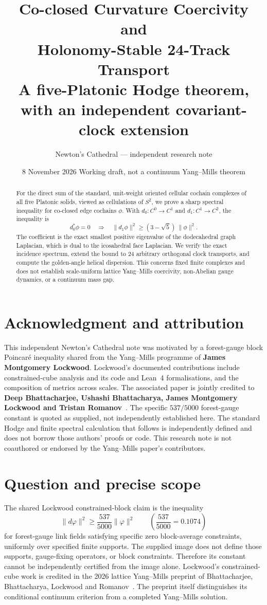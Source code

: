 \documentclass[11pt,a4paper]{article}
\title{\vspace{-1.1cm}\textbf{Co-closed Curvature Coercivity and\\Holonomy-Stable 24-Track Transport}\\[5pt]\large A five-Platonic Hodge theorem, with an independent covariant-clock extension}
\author{Newton's Cathedral --- independent research note}
\date{8 November 2026 \;\textbullet\; Working draft, not a continuum Yang--Mills theorem}
\begin{document}
\maketitle
\vspace{-7mm}
\begin{abstract}
For the direct sum of the standard, unit-weight oriented cellular cochain complexes of all five Platonic solids, viewed as cellulations of $S^2$, we prove a sharp spectral inequality for co-closed edge cochains $\phi$. With $d_0:C^0\to C^1$ and $d_1:C^1\to C^2$, the inequality is
\[
\boxed{\quad d_0^{\!*}\phi=0\quad\Longrightarrow\quad
\|d_1\phi\|^2\ge (3-\sqrt 5)\,\|\phi\|^2.\quad}
\]
The coefficient is the exact smallest positive eigenvalue of the dodecahedral graph Laplacian, which is dual to the icosahedral face Laplacian. We verify the exact incidence spectrum, extend the bound to 24 arbitrary orthogonal clock transports, and compute the golden-angle helical dispersion. This concerns fixed finite complexes and does not establish scale-uniform lattice Yang--Mills coercivity, non-Abelian gauge dynamics, or a continuum mass gap.
\end{abstract}

\section*{Acknowledgment and attribution}
This independent Newton's Cathedral note was motivated by a forest-gauge
block Poincar\'e inequality shared from the Yang--Mills programme of
\textbf{James Montgomery Lockwood}. Lockwood's documented contributions
include constrained-cube analysis and its code and Lean~4 formalisations,
and the composition of metrics across scales. The associated paper is
jointly credited to \textbf{Deep Bhattacharjee, Ushashi Bhattacharya,
James Montgomery Lockwood and Tristan Romanov}~\cite{bhattacharjee2026}.
The specific $537/5000$ forest-gauge constant is quoted as supplied, not
independently established here. The standard Hodge and finite spectral
calculation that follows is independently defined and does not borrow
those authors' proofs or code. This research note is not coauthored or
endorsed by the Yang--Mills paper's contributors.

\section{Question and precise scope}
The shared Lockwood constrained-block claim is the inequality
\begin{equation}\label{eq:lockwood}
 \|d\varphi\|^2\ge \frac{537}{5000}\|\varphi\|^2
 \qquad\left(\frac{537}{5000}=0.1074\right)
\end{equation}
for forest-gauge link fields satisfying specific zero block-average constraints, uniformly over specified finite supports. The supplied image does not define those supports, gauge-fixing operators, or block constraints. Therefore its constant cannot be independently certified from the image alone. Lockwood's constrained-cube work is credited in the 2026 lattice Yang--Mills preprint of Bhattacharjee, Bhattacharya, Lockwood and Romanov~\cite{bhattacharjee2026}. The preprint itself distinguishes its conditional continuum criterion from a completed Yang--Mills solution.
\end{document}
